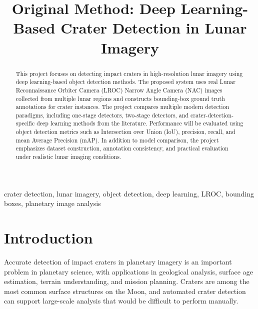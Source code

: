 \documentclass[conference]{IEEEtran}
\begin{document}
	
	\title{Original Method: Deep Learning-Based Crater Detection in Lunar Imagery}
	
	\author{
		}
	
	\maketitle
	
	\begin{abstract}
		This project focuses on detecting impact craters in high-resolution lunar imagery using deep learning-based object detection methods. The proposed system uses real Lunar Reconnaissance Orbiter Camera (LROC) Narrow Angle Camera (NAC) images collected from multiple lunar regions and constructs bounding-box ground truth annotations for crater instances. The project compares multiple modern detection paradigms, including one-stage detectors, two-stage detectors, and crater-detection-specific deep learning methods from the literature. Performance will be evaluated using object detection metrics such as Intersection over Union (IoU), precision, recall, and mean Average Precision (mAP). In addition to model comparison, the project emphasizes dataset construction, annotation consistency, and practical evaluation under realistic lunar imaging conditions.
	\end{abstract}
	
	\begin{IEEEkeywords}
		crater detection, lunar imagery, object detection, deep learning, LROC, bounding boxes, planetary image analysis
	\end{IEEEkeywords}
	
	\section{Introduction}
	Accurate detection of impact craters in planetary imagery is an important problem in planetary science, with applications in geological analysis, surface age estimation, terrain understanding, and mission planning. Craters are among the most common surface structures on the Moon, and automated crater detection can support large-scale analysis that would be difficult to perform manually.
	
\end{document}
